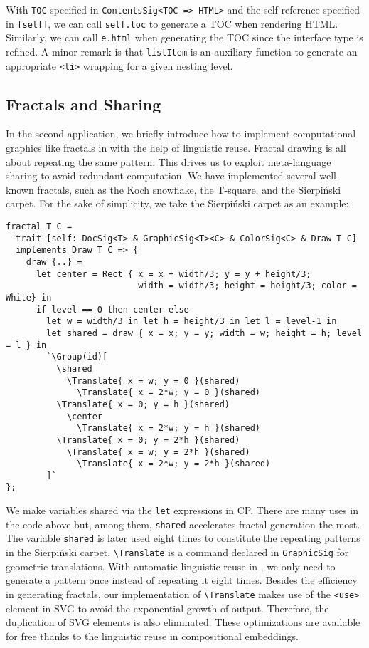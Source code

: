 \noindent With \lstinline{TOC} specified in \lstinline{ContentsSig<TOC => HTML>}
and the self-reference specified in \lstinline{[self]}, we can call
\lstinline{self.toc} to generate a TOC when rendering HTML. Similarly, we can
call \lstinline{e.html} when generating the TOC since the interface type is
refined. A minor remark is that \lstinline{listItem} is an auxiliary function to
generate an appropriate \lstinline{<li>} wrapping for a given nesting level.

\subsection{Fractals and Sharing} \label{sec:fractal}

In the second application, we briefly introduce how to implement computational
graphics like fractals in \ExT with the help of linguistic reuse. Fractal
drawing is all about repeating the same pattern. This drives us to exploit
meta-language sharing to avoid redundant computation. We have implemented
several well-known fractals, such as the Koch snowflake, the T-square, and the
Sierpiński carpet. For the sake of simplicity, we take the Sierpiński carpet as
an example:

\begin{lstlisting}
fractal T C =
  trait [self: DocSig<T> & GraphicSig<T><C> & ColorSig<C> & Draw T C]
  implements Draw T C => {
    draw {..} =
      let center = Rect { x = x + width/3; y = y + height/3;
                          width = width/3; height = height/3; color = White} in
      if level == 0 then center else
        let w = width/3 in let h = height/3 in let l = level-1 in
        let shared = draw { x = x; y = y; width = w; height = h; level = l } in
        `\Group(id)[
          \shared
            \Translate{ x = w; y = 0 }(shared)
              \Translate{ x = 2*w; y = 0 }(shared)
          \Translate{ x = 0; y = h }(shared)
            \center
              \Translate{ x = 2*w; y = h }(shared)
          \Translate{ x = 0; y = 2*h }(shared)
            \Translate{ x = w; y = 2*h }(shared)
              \Translate{ x = 2*w; y = 2*h }(shared)
        ]`
};
\end{lstlisting}

\noindent We make variables shared via the \lstinline{let} expressions in CP.
There are many uses in the code above but, among them, \lstinline{shared}
accelerates fractal generation the most. The variable \lstinline{shared} is
later used eight times to constitute the repeating patterns in the Sierpiński
carpet. \lstinline{\Translate} is a command declared in \lstinline{GraphicSig}
for geometric translations. With automatic linguistic reuse in \ExT, we only
need to generate a pattern once instead of repeating it eight times. Besides the
efficiency in generating fractals, our implementation of \lstinline{\Translate}
makes use of the \lstinline{<use>} element in SVG to avoid the exponential
growth of output. Therefore, the duplication of SVG elements is also eliminated.
These optimizations are available for free thanks to the linguistic reuse in
compositional embeddings.

